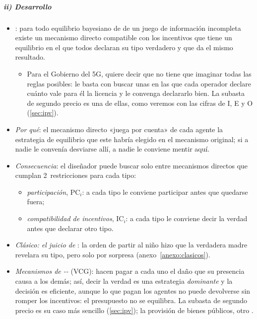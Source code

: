 \documentclass[11pt]{article}
\begin{document}
\subparagraph{ii) Desarrollo}

\begin{itemize}
\item {}\nocite{Gibbard1973Manipulation,DasguptaHammondMaskin1979Implementation,Myerson1979Incentive}: para todo equilibrio bayesiano de  de un juego de información incompleta existe un mecanismo directo compatible con los incentivos que tiene un equilibrio en el que todos declaran su tipo verdadero y que da el mismo resultado.
  \begin{itemize}
  \item Para el Gobierno del 5G, quiere decir que no tiene que imaginar todas las reglas posibles: le basta con buscar unas en las que cada operador declare cuánto vale para él la licencia y le convenga declararlo bien. La subasta de segundo precio es una de ellas, como veremos con las cifras de \textup{I}, E y O (\ref{sec:ipv}).
  \end{itemize}
\item \emph{Por qué}: el mecanismo directo «juega por cuenta» de cada agente la estrategia de equilibrio que este habría elegido en el mecanismo original; si a nadie le convenía desviarse allí, a nadie le conviene mentir aquí.
\item \emph{Consecuencia}: el diseñador puede buscar solo entre mecanismos directos que cumplan 2~restricciones para cada tipo:
  \begin{itemize}
  \item \emph{participación}, $\mathrm{PC}_i$: a cada tipo le conviene participar antes que quedarse fuera;
  \item \emph{compatibilidad de incentivos}, $\mathrm{IC}_i$: a cada tipo le conviene decir la verdad antes que declarar otro tipo.
  \end{itemize}
\item \emph{Clásico: el juicio de }: la orden de partir al niño hizo que la verdadera madre revelara su tipo, pero solo por sorpresa (anexo~\ref{anexo:clasicos}).
\item \emph{Mecanismos de --} (VCG): hacen pagar a cada uno el daño que su presencia causa a los demás; así, decir la verdad es una estrategia \emph{dominante} y la decisión es eficiente, aunque lo que pagan los agentes no puede devolverse sin romper los incentivos: el presupuesto no se equilibra\nocite{GreenLaffont1977Characterization}\nocite{Vickrey1961Counterspeculation,Clarke1971Multipart,Groves1973Incentives}. La subasta de segundo precio es su caso más sencillo (\ref{sec:ipv}); la provisión de bienes públicos, otro .
\end{itemize}
\end{document}
